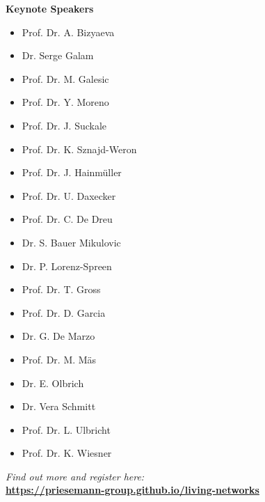 \documentclass[a4paper,10pt]{article}
\begin{document}
\begin{minipage}[t]{0.50\textwidth}
  {\large\textbf{\color{TealPrimary}Keynote Speakers}}\\[6pt]
  \begin{minipage}[t]{0.48\textwidth}
    \begin{itemize}[leftmargin=*,itemsep=1pt]
      \footnotesize\color{TealDark}\bfseries
      \item Prof. Dr. A. Bizyaeva
      \item Dr. Serge Galam
      \item Prof. Dr. M. Galesic
      \item Prof. Dr. Y. Moreno
      \item Prof. Dr. J. Suckale
      \item Prof. Dr. K. Sznajd-Weron
      \item Prof. Dr. J. Hainmüller
      \item Prof. Dr. U. Daxecker
      \item Prof. Dr. C. De Dreu
      \item Dr. S. Bauer Mikulovic
    \end{itemize}
  \end{minipage}
  \hfill
  \begin{minipage}[t]{0.48\textwidth}
    \begin{itemize}[leftmargin=*,itemsep=1pt]
      \footnotesize\color{TealDark}\bfseries
      \item Dr. P. Lorenz-Spreen
      \item Prof. Dr. T. Gross
      \item Prof. Dr. D. Garcia
      \item Dr. G. De Marzo
      \item Prof. Dr. M. Mäs
      \item Dr. E. Olbrich
      \item Dr. Vera Schmitt
      \item Prof. Dr. L. Ulbricht
      \item Prof. Dr. K. Wiesner
    \end{itemize}
  \end{minipage}

  \vspace{10pt}
  \begin{tcolorbox}[colback=TealMedium!30!white,colframe=TealMedium,arc=2mm,center,halign=center]
    {\scriptsize\textit{Find out more and register here:}}\\[2pt]
    {\footnotesize\textbf{\url{https://priesemann-group.github.io/living-networks}}}
  \end{tcolorbox}
\end{minipage}
\end{document}
